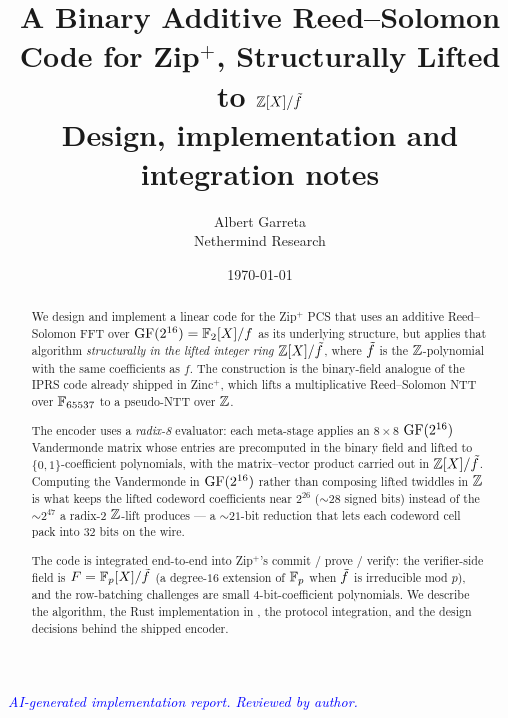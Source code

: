 \documentclass[11pt]{article}
\title{A Binary Additive Reed--Solomon Code for Zip$^+$, Structurally Lifted to $\mathbb{Z}[X]/\tilde f$ \\
       \large Design, implementation and integration notes}
\author{Albert Garreta \\[2pt] \normalsize Nethermind Research}
\date{\today}
\begin{document}
\maketitle

\begin{center}
\textcolor{blue}{\textit{AI-generated implementation report. Reviewed by author.}}
\end{center}
\vspace{0.5em}

\begin{abstract}
We design and implement a linear code for the Zip$^+$ PCS that uses
an additive Reed--Solomon FFT over $\operatorname{GF}(2^{16}) = \mathbb{F}_2[X]/f$ as its
underlying structure, but applies that algorithm \emph{structurally
in the lifted integer ring} $\mathbb{Z}[X]/\tilde f$, where $\tilde f$ is the
$\mathbb{Z}$-polynomial with the same coefficients as $f$. The construction
is the binary-field analogue of the IPRS code already shipped in
Zinc$^+$, which lifts a multiplicative Reed--Solomon NTT over
$\mathbb{F}_{65537}$ to a pseudo-NTT over $\mathbb{Z}$.

The encoder uses a \emph{radix-8} evaluator: each meta-stage applies
an $8 \times 8$ $\operatorname{GF}(2^{16})$ Vandermonde matrix whose entries are
precomputed in the binary field and lifted to $\{0,1\}$-coefficient
polynomials, with the matrix--vector product carried out in
$\mathbb{Z}[X]/\tilde f$. Computing the Vandermonde in $\operatorname{GF}(2^{16})$ rather than
composing lifted twiddles in $\mathbb{Z}$ is what keeps the lifted codeword
coefficients near $2^{26}$ ($\sim 28$ signed bits) instead of the
$\sim 2^{47}$ a radix-2 $\mathbb{Z}$-lift produces --- a $\sim 21$-bit
reduction that lets each codeword cell pack into $32$ bits on the wire.

The code is integrated end-to-end into Zip$^+$'s commit / prove /
verify: the verifier-side field is $F = \mathbb{F}_p[X]/\tilde f$ (a degree-$16$
extension of $\mathbb{F}_p$ when $\tilde f$ is irreducible mod $p$), and the
row-batching challenges are small $4$-bit-coefficient polynomials. We
describe the algorithm, the Rust implementation in
, the protocol
integration, and the design decisions behind the shipped encoder.
\end{abstract}

\tableofcontents








\end{document}
